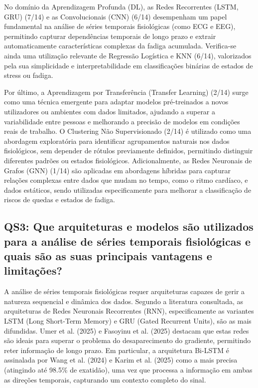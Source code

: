 No domínio da Aprendizagem Profunda (DL), as Redes Recorrentes (LSTM, GRU) (7/14) e as Convolucionais (CNN) (6/14) desempenham um papel fundamental na análise de séries temporais fisiológicas (como ECG e EEG), permitindo capturar dependências temporais de longo prazo e extrair automaticamente características complexas da fadiga acumulada. Verifica-se ainda uma utilização relevante de Regressão Logística e KNN (6/14), valorizados pela sua simplicidade e interpretabilidade em classificações binárias de estados de stress ou fadiga.

Por último, a Aprendizagem por Transferência (Transfer Learning) (2/14) surge como uma técnica emergente para adaptar modelos pré-treinados a novos utilizadores ou ambientes com dados limitados, ajudando a superar a variabilidade entre pessoas e melhorando a precisão de modelos em condições reais de trabalho. O Clustering Não Supervisionado (2/14) é utilizado como uma abordagem exploratória para identificar agrupamentos naturais nos dados fisiológicos, sem depender de rótulos previamente definidos, permitindo distinguir diferentes padrões ou estados fisiológicos. Adicionalmente, as Redes Neuronais de Grafos (GNN) (1/14) são aplicadas em abordagens híbridas para capturar relações complexas entre dados que mudam no tempo, como o ritmo cardíaco, e dados estáticos, sendo utilizadas especificamente para melhorar a classificação de riscos de quedas e estados de fadiga.

\subsection*{QS3: Que arquiteturas e modelos são utilizados para a análise de séries temporais fisiológicas e quais são as suas principais vantagens e limitações?}
\label{subsec:qs3}

A análise de séries temporais fisiológicas requer arquiteturas capazes de gerir a natureza sequencial e dinâmica dos dados. Segundo a literatura consultada, as arquiteturas de Redes Neuronais Recorrentes (RNN), especificamente as variantes LSTM (Long Short-Term Memory) e GRU (Gated Recurrent Units), são as mais difundidas. Umer et al. (2025) e Fasoyinu et al. (2025)\cite{umer2025,fasoyinu2025} destacam que estas redes são ideais para superar o problema do desaparecimento do gradiente, permitindo reter informação de longo prazo. Em particular, a arquitetura Bi-LSTM é assinalada por Wang et al. (2024) e Karim et al. (2025)\cite{wang2024,karim2025} como a mais precisa (atingindo até 98.5\% de exatidão), uma vez que processa a informação em ambas as direções temporais, capturando um contexto completo do sinal.

